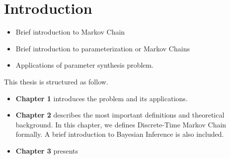 \chapter{Introduction} 
{\color{red}
  \begin{itemize}
  \item Brief introduction to Markov Chain
  \item Brief introduction to parameterization or Markov Chains
  \item Applications of parameter synthesis problem.
  \end{itemize}
}

This thesis is structured as follow.
\begin{itemize}
\item \textbf{Chapter 1} introduces the problem and its applications. 
\item \textbf{Chapter 2} describes the most important definitions and
  theoretical background. In this chapter, we defines Discrete-Time Markov Chain
  formally. A brief introduction to Bayesian Inference is also included.
\item \textbf{Chapter 3} presents 
\end{itemize}